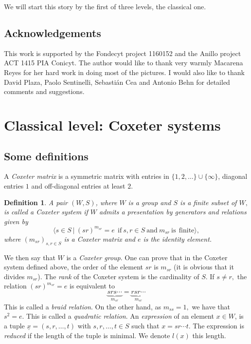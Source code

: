 \documentclass[12pt]{wart}
\newtheorem{defi}{Definition}
\theoremstyle{remark}
\begin{document}
We will start this story by the first of three levels, the classical one. 


\subsection{Acknowledgements} This work is supported by the Fondecyt project 1160152 and the Anillo project ACT 1415 PIA Conicyt. The author would like to thank very warmly Macarena Reyes for her hard  work in doing most of the pictures. I  would also like to thank David Plaza, Paolo Sentinelli, Sebasti\'an Cea and Antonio Behn for detailed comments and suggestions.


\section{Classical level: Coxeter systems}

\subsection{Some definitions}\label{Some definitions} 


 A \emph{Coxeter matrix} is a symmetric matrix   with entries in $\{1,2,\ldots\}\cup \{\infty\}$,  diagonal entries $1$ and off-diagonal entries at least $2$.


 
\begin{defi} A pair $(W,S)$, where $W$ is a group and $S$ is a finite subset of $W,$  is called a \emph{Coxeter system} if $W$ admits a presentation by generators and relations given by
$$ \langle s\in S\ \vert \ (sr)^{m_{sr}}=e\ \ \mathrm{if}\  s,r \in S \ \mathrm{and}\  m_{sr} \ \mathrm{is}\ \ \mathrm{finite} \rangle,$$
where $(m_{sr})_{s,r\in S}$ is a Coxeter matrix and $e$ is the identity element.
\end{defi}

We  then say  that $W$ is a \emph{Coxeter group}.
One can prove that in the Coxeter system defined above, the order of the element $sr$ is $m_{sr}$ (it is obvious that it divides $m_{sr}$). 
The \emph{rank} of the Coxeter system is the cardinality of $S$.
If $s\neq r,$ the relation $(sr)^{m_{sr}}=e$ is equivalent to 
$$\underbrace{srs\cdots}_{m_{sr}}=\underbrace{rsr\cdots}_{m_{sr}}$$
This is called a \emph{braid relation}. On the other hand, as $m_{ss}=1,$ we have that $s^2=e.$ This is called a \emph{quadratic relation}.
An \emph{expression}  of an element $x\in W$, is a tuple $\underline{x}=(s,r,\ldots, t)$ with $s,r,\ldots, t \in S$ such that $x=sr\cdots t$. The expression is \emph{reduced} if the length of the tuple is minimal. We denote $l(x)$ this length. 
\end{document}
